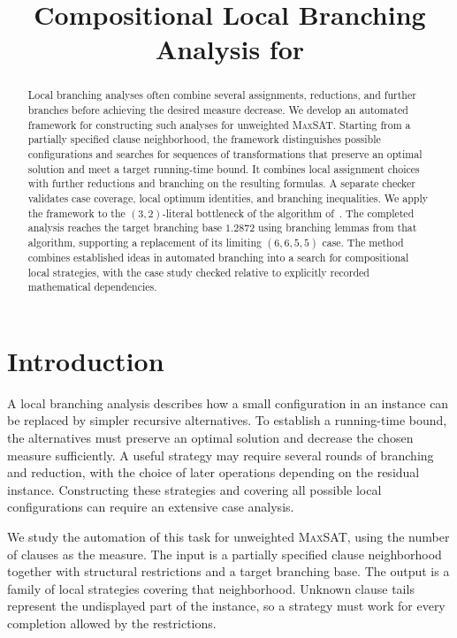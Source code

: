 \documentclass[11pt]{article}
\title{Compositional Local Branching Analysis for \MaxSAT{}}
\author{}
\date{}
\newcommand{\MaxSAT}{\textnormal{\textsc{MaxSAT}}}
\theoremstyle{definition}
\theoremstyle{remark}
\begin{document}
\maketitle

\begin{abstract}
Local branching analyses often combine several assignments, reductions, and
further branches before achieving the desired measure decrease. We develop
an automated framework for constructing such analyses for unweighted
\MaxSAT{}. Starting from a partially specified clause neighborhood, the
framework distinguishes possible configurations and searches for sequences of
transformations that preserve an optimal solution and meet a target
running-time bound. It combines local assignment choices with further
reductions and branching on the resulting formulas.
A separate checker validates case coverage, local optimum identities, and
branching inequalities. We apply the framework to the $(3,2)$-literal
bottleneck of the algorithm of~\cite{Xiao2022}. The completed analysis reaches
the target branching base $1.2872$ using branching lemmas from that algorithm, supporting a replacement
of its limiting $(6,6,5,5)$ case. The method combines established ideas in
automated branching into a search for compositional local strategies, with
the case study checked relative to explicitly recorded mathematical
dependencies.
\end{abstract}

\section{Introduction}
\label{sec:introduction}

A local branching analysis describes how a small configuration in an instance
can be replaced by simpler recursive alternatives. To establish a running-time
bound, the alternatives must preserve an optimal solution and decrease the
chosen measure sufficiently. A useful strategy may require several rounds of
branching and reduction, with the choice of later operations depending on the
residual instance. Constructing these strategies and covering all possible
local configurations can require an extensive case analysis.

We study the automation of this task for unweighted \MaxSAT{}, using the
number of clauses as the measure. The input is a partially specified clause
neighborhood together with structural restrictions and a target branching
base. The output is a family of local strategies covering that neighborhood.
Unknown clause tails represent the undisplayed part of the instance, so a
strategy must work for every completion allowed by the restrictions.
\end{document}
